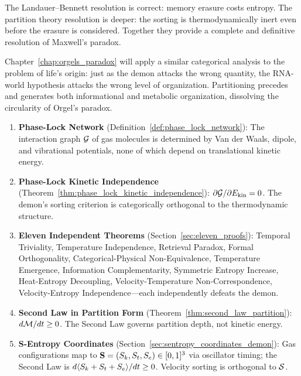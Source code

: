 The Landauer--Bennett resolution is correct: memory erasure costs entropy.
The partition theory resolution is deeper: the sorting is thermodynamically
inert even before the erasure is considered. Together they provide a complete
and definitive resolution of Maxwell's paradox.

Chapter~\ref{chap:orgels_paradox} will apply a similar categorical analysis
to the problem of life's origin: just as the demon attacks the wrong quantity,
the RNA-world hypothesis attacks the wrong level of organization. Partitioning
precedes and generates both informational and metabolic organization, dissolving
the circularity of Orgel's paradox.

\begin{chapterbox}[title=Chapter 5 --- Key Results Established]
\begin{enumerate}[label=\textbf{\arabic*.}]
  \item \textbf{Phase-Lock Network} (Definition~\ref{def:phase_lock_network}):
        The interaction graph $\mathcal{G}$ of gas molecules is determined
        by Van der Waals, dipole, and vibrational potentials, none of which
        depend on translational kinetic energy.

  \item \textbf{Phase-Lock Kinetic Independence} (Theorem~\ref{thm:phase_lock_kinetic_independence}):
        $\partial \mathcal{G} / \partial E_{\mathrm{kin}} = 0$. The demon's
        sorting criterion is categorically orthogonal to the thermodynamic structure.

  \item \textbf{Eleven Independent Theorems} (Section~\ref{sec:eleven_proofs}):
        Temporal Triviality, Temperature Independence, Retrieval Paradox, Formal
        Orthogonality, Categorical-Physical Non-Equivalence, Temperature Emergence,
        Information Complementarity, Symmetric Entropy Increase, Heat-Entropy
        Decoupling, Velocity-Temperature Non-Correspondence, Velocity-Entropy
        Independence---each independently defeats the demon.

  \item \textbf{Second Law in Partition Form} (Theorem~\ref{thm:second_law_partition}):
        $d\mathcal{M}/dt \geq 0$. The Second Law governs partition depth, not kinetic
        energy.

  \item \textbf{S-Entropy Coordinates} (Section~\ref{sec:sentropy_coordinates_demon}):
        Gas configurations map to $\mathbf{S} = (S_k, S_t, S_e) \in [0,1]^3$ via
        oscillator timing; the Second Law is $d\langle S_k + S_t + S_e \rangle/dt \geq 0$.
        Velocity sorting is orthogonal to $\mathcal{S}$.


\end{enumerate}
\end{chapterbox}
